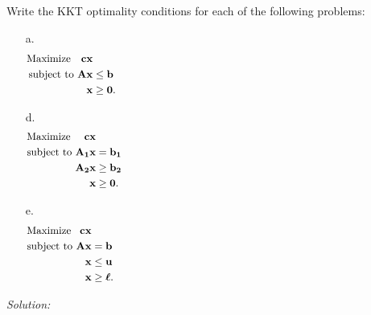 \documentclass[12pt]{amsart}
\begin{document}
\clearpage
\setcounter{subsection}{40}
\subsection{}
Write the KKT optimality conditions for each of the following problems:
\begin{enumerate}
	\item[a.] \begin{align*}
		\text{Maximize }\,\,\ \mathbf{cx} & \hspace{75ex}\\
		\text{subject to  } \mathbf{Ax} &\leq \mathbf{b} \\
		\mathbf{x} &\geq \mathbf{0}.
	\end{align*}
	\item[d.]\begin{align*}
		\text{Maximize }\quad \mathbf{cx} & \hspace{75ex}\\
		\text{subject to  } \mathbf{A_1x} &= \mathbf{b_1} \\
		\mathbf{A_2x} &\geq \mathbf{b_2} \\
		\mathbf{x} &\geq \mathbf{0}.
	\end{align*}
	\item[e.] \begin{align*}
		\text{Maximize }\,\ \mathbf{cx} & \hspace{75ex}\\
		\text{subject to  } \mathbf{Ax} &= \mathbf{b} \\
		\mathbf{x} &\leq \mathbf{u} \\
		\mathbf{x} &\geq \boldsymbol{\ell}.
	\end{align*}
\end{enumerate}

\bigskip
\textit{Solution:}
\end{document}
